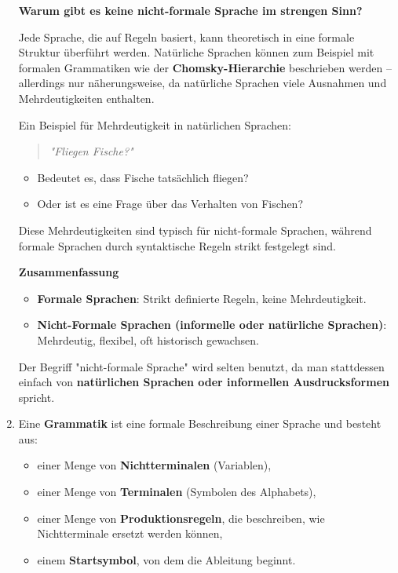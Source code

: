 \documentclass[a4paper,12pt]{article}
\begin{document}
\begin{enumerate}
\textbf{Warum gibt es keine nicht-formale Sprache im strengen Sinn?}

Jede Sprache, die auf Regeln basiert, kann theoretisch in eine formale Struktur überführt werden. Natürliche Sprachen können zum Beispiel mit formalen Grammatiken wie der \textbf{Chomsky-Hierarchie} beschrieben werden – allerdings nur näherungsweise, da natürliche Sprachen viele Ausnahmen und Mehrdeutigkeiten enthalten.

Ein Beispiel für Mehrdeutigkeit in natürlichen Sprachen:

\begin{quote}
	\textit{"Fliegen Fische?"}
\end{quote}

\begin{itemize}
	\item Bedeutet es, dass Fische tatsächlich fliegen?
	\item Oder ist es eine Frage über das Verhalten von Fischen?
\end{itemize}

Diese Mehrdeutigkeiten sind typisch für nicht-formale Sprachen, während formale Sprachen durch syntaktische Regeln strikt festgelegt sind.

\textbf{Zusammenfassung}

\begin{itemize}
	\item \textbf{Formale Sprachen}: Strikt definierte Regeln, keine Mehrdeutigkeit.
	\item \textbf{Nicht-Formale Sprachen (informelle oder natürliche Sprachen)}: Mehrdeutig, flexibel, oft historisch gewachsen.
\end{itemize}

Der Begriff "nicht-formale Sprache" wird selten benutzt, da man stattdessen einfach von \textbf{natürlichen Sprachen oder informellen Ausdrucksformen} spricht.

			\item Eine \textbf{Grammatik} ist eine formale Beschreibung einer Sprache und besteht aus:
	\begin{itemize}
		\item einer Menge von \textbf{Nichtterminalen} (Variablen),
		\item einer Menge von \textbf{Terminalen} (Symbolen des Alphabets),
		\item einer Menge von \textbf{Produktionsregeln}, die beschreiben, wie Nichtterminale ersetzt werden können,
		\item einem \textbf{Startsymbol}, von dem die Ableitung beginnt.
	\end{itemize}
	

\end{enumerate}
\end{document}
